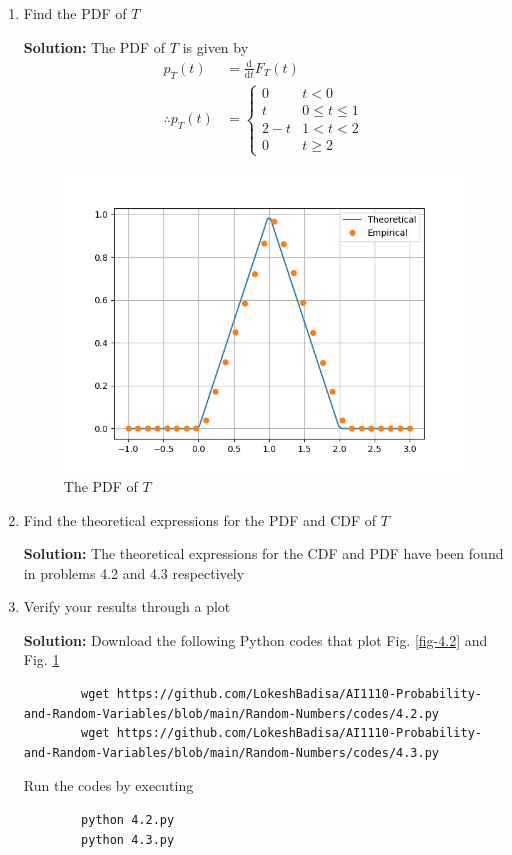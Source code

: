 \documentclass[journal,12pt,twocolumn]{IEEEtran}
\newcommand{\solution}{\noindent \textbf{Solution: }}
\providecommand{\der}[1]{\mathrm{d} #1}
\numberwithin{equation}{section}
\renewcommand\thesection{\arabic{section}}
\begin{document}
\begin{enumerate}[label=\thesection.\arabic*,ref=\thesection.\theenumi]
	\item Find the PDF of $T$
	
	\solution The PDF of $T$ is given by
	\begin{align}
		p_T(t) &= \frac{\der{}}{\der{t}} F_T(t) \\
		\therefore p_T(t) &=
		\begin{cases}
			0 & t < 0 \\
			t & 0 \le t \le 1 \\
			2 - t & 1 < t < 2 \\
			0 & t \ge 2
		\end{cases}
	\end{align}
	
	\begin{figure}
		\centering
		\includegraphics[width=\columnwidth]{./figs/4.3.png}
		\caption{The PDF of $T$}
		\label{fig-4.3}
	\end{figure}		
	
	\item Find the theoretical expressions for the PDF and CDF of $T$
	
	\solution The theoretical expressions for the CDF and PDF have been found in problems 4.2 and 4.3 respectively

	\item Verify your results through a plot
	
	\solution Download the following Python codes that plot Fig. \ref{fig-4.2} and Fig. \ref{fig-4.3}
	\begin{lstlisting}
		wget https://github.com/LokeshBadisa/AI1110-Probability-and-Random-Variables/blob/main/Random-Numbers/codes/4.2.py
		wget https://github.com/LokeshBadisa/AI1110-Probability-and-Random-Variables/blob/main/Random-Numbers/codes/4.3.py
	\end{lstlisting}
	Run the codes by executing
	\begin{lstlisting}
		python 4.2.py
		python 4.3.py
	\end{lstlisting}
	
	
	\end{enumerate}
	
\end{document}
